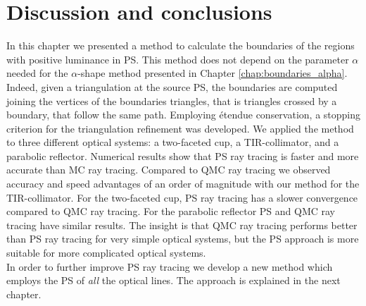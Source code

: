 \section{Discussion and conclusions}
In this chapter we presented a method to calculate the boundaries of the regions with positive luminance in PS. This method does not depend on the parameter $\alpha$ needed for the $\alpha$-shape method presented in Chapter \ref{chap:boundaries_alpha}. Indeed, given a triangulation at the source PS, the boundaries are computed joining the vertices of the boundaries triangles, that is triangles crossed by a boundary, that follow the same path. Employing \'{e}tendue conservation, a stopping criterion for the triangulation refinement was developed. We applied the method to three different optical systems: a two-faceted cup, a TIR-collimator, and a parabolic reflector. Numerical results show that PS ray tracing is faster and more accurate than MC ray tracing. Compared to QMC ray tracing we observed accuracy and speed advantages of an order of magnitude with our method for the TIR-collimator. 
For the two-faceted cup, PS ray tracing has a slower convergence compared to QMC ray tracing. For the parabolic reflector PS and QMC ray tracing have similar results.
The insight is that QMC ray tracing performs better than PS ray tracing for very simple optical systems, but the PS approach is more suitable for more complicated optical systems.
\\ \indent In order to further improve PS ray tracing we develop a new method which employs the PS of \textit{all} the optical lines. The approach is explained in the next chapter.









 

